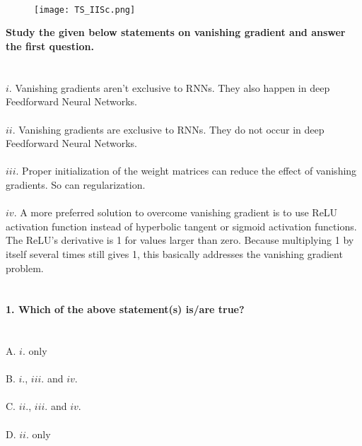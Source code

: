 \documentclass[prl,twocolumn,showpacs,preprintnumbers,superscriptaddress]{revtex4}
\theoremstyle{plain}
\theoremstyle{definition}
\begin{document}
\begin{widetext}
\\
\\
\\

\begin{wrapfigure}
\centering
\end{wrapfigure}
\begin{figure}[h!]
 \begin{right}
  \hfill\texttt{[image: TS\_IISc.png]}
 \end{right}
\end{figure}
\noindent\textbf{Study the given below statements on vanishing gradient and answer the first question.}
\\
\\
\\
$i.$ Vanishing gradients aren't exclusive to RNNs. They also happen in deep Feedforward Neural Networks.
\\
\\
$ii.$ Vanishing gradients are exclusive to RNNs. They do not occur in deep Feedforward Neural Networks.
\\
\\
$iii.$ Proper initialization of the weight matrices can reduce the effect of vanishing gradients. So can regularization.
\\
\\
$iv.$ A more preferred solution to overcome vanishing gradient is to use ReLU activation function instead of hyperbolic tangent or sigmoid activation functions. The ReLU's derivative is 1 for values larger than zero. Because multiplying 1 by itself several times still gives 1, this basically addresses the vanishing gradient problem.
\\
\\
\\
\textbf{1. Which of the above statement(s) is/are true?}
\\
\\
\\
\noindent A. $i.$ only
\\
\\
B. $i.$, $iii.$ and $iv.$
\\
\\
C. $ii.$, $iii.$ and $iv.$
\\
\\
D. $ii.$ only

\end{widetext}
\end{document}
